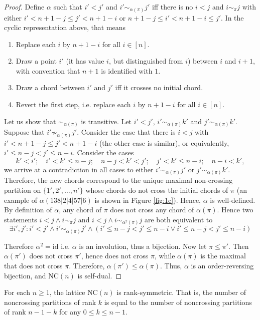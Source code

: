 \begin{proof}
  Define $\alpha$ such that $i'<j'$ and $i'\sim_{\alpha(\pi)}j'$ iff there is no $i < j$ and $i\sim_{\pi}j$ with either $i' < n+1-j \le j' < n+1-i$ or $n+1-j \le i' < n+1-i \le j'$. In the cyclic representation above, that means
  \begin{enumerate}
    \item Replace each $i$ by $n+1-i$ for all $i\in [n]$.
    \item Draw a point $i'$ (it has value $i$, but distinguished from $i$) between $i$ and $i+1$, with convention that $n+1$ is identified with $1$.
    \item Draw a chord between $i'$ and $j'$ iff it crosses no initial chord.
    \item Revert the first step, i.e. replace each $i$ by $n+1-i$ for all $i\in [n]$.
  \end{enumerate}

  Let us show that $\sim_{\alpha(\pi)}$ is transitive. Let $i'<j'$, $i'\sim_{\alpha(\pi)}k'$ and $j'\sim_{\alpha(\pi)}k'$. Suppose that $i'\not\sim_{\alpha(\pi)}j'$. Consider the case that there is $i<j$ with $i' < n+1-j \le j' < n+1-i$ (the other case is similar), or equivalently, $i' \le n-j < j' \le n-i$. Consider the cases
  $$k'<i'; \quad i'<k'\le n-j; \quad n-j < k' < j'; \quad j' < k' \le n-i; \quad n-i < k',$$
  we arrive at a contradiction in all cases to either $i'\sim_{\alpha(\pi)}j'$ or $j'\sim_{\alpha(\pi)}k'$. Therefore, the new chords correspond to the unique maximal non-crossing partition on $\{1', 2', \dots, n'\}$ whose chords do not cross the initial chords of $\pi$ (an example of $\alpha(138|2|4|57|6)$ is shown in Figure \ref{fig:1c}). Hence, $\alpha$ is well-defined. By definition of $\alpha$, any chord of $\pi$ does not cross any chord of $\alpha(\pi)$. Hence two statements $i<j \wedge i\sim_{\pi}j$ and $i<j \wedge i\sim_{\alpha^2(\pi)}j$ are both equivalent to
  $$\exists i',j': i'<j'\wedge  i'\sim_{\alpha(\pi)}j'\wedge (i' \le n-j < j' \le n-i \vee i' \le n-j < j' \le n-i)$$

  Therefore $\alpha^2 = \text{id}$ i.e. $\alpha$ is an involution, thus a bijection. Now let $\pi\le \pi'$. Then $\alpha(\pi')$ does not cross $\pi'$, hence does not cross $\pi$, while $\alpha(\pi)$ is the maximal that does not cross $\pi$. Therefore, $\alpha(\pi') \le \alpha(\pi)$. Thus, $\alpha$ is an order-reversing bijection, and $\text{NC}(n)$ is self-dual.
\end{proof}

\begin{theorem}
  For each $n\ge 1$, the lattice $\text{NC}(n)$ is rank-symmetric. That is, the number of noncrossing partitions of rank $k$ is equal to the number of noncrossing partitions of rank $n-1-k$ for any $0\le k \le n-1$.
\end{theorem}

